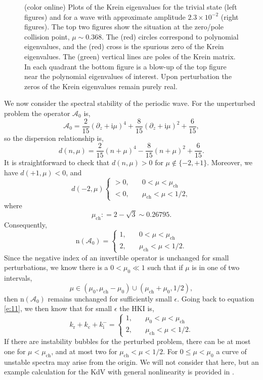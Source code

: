 \documentclass[review,onefignum,onetabnum]{siamart171218}
\def\coloneqq{\mathrel{\mathop:}=}
\newcommand{\rmc}{\mathrm{c}}
\newcommand{\rmi}{\mathrm{i}}
\newcommand{\rmn}{\mathrm{n}}
\newcommand{\rmr}{\mathrm{r}}
\newcommand{\calA}{\mathcal{A}}
\begin{document}
\begin{figure}[ht]
\begin{center}
\begin{tabular}{cc}
\end{tabular}
\caption{(color online) Plots of the Krein eigenvalues for the trivial state (left figures) and for
a wave with approximate amplitude $2.3\times10^{-2}$ (right figures). The top two figures show the
situation at the zero/pole collision
point, $\mu\sim0.368$. The (red) circles correspond to polynomial eigenvalues, and the (red) cross
is the spurious zero of the Krein eigenvalues. The (green) vertical lines are poles
of the Krein matrix. In each quadrant the bottom figure is a blow-up
of the top figure near the polynomial eigenvalues of interest. Upon perturbation the zeros of the Krein eigenvalues remain purely real.}
\label{f:KreinEvalCollide1}
\end{center}
\end{figure}

We now consider the spectral stability of the periodic wave.
For the unperturbed problem the operator $\calA_0$ is,
\[
\calA_0=\frac2{15}(\partial_z+\rmi\mu)^4+\frac8{15}(\partial_z+\rmi\mu)^2+\frac6{15},
\]
so the dispersion relationship is,
\[
d(n,\mu)=\frac2{15}(n+\mu)^4-\frac8{15}(n+\mu)^2+\frac6{15}.
\]
It is straightforward to check that $d(n,\mu)>0$ for $\mu\notin\{-2,+1\}$.
Moreover, we have $d(+1,\mu)<0$, and
\[
d(-2,\mu)\begin{cases}>0,\quad&0<\mu<\mu_{\mathrm{ch}}\\
<0,\quad&\mu_{\mathrm{ch}}<\mu<1/2,\end{cases}
\]
where
\[
\mu_{\mathrm{ch}}\coloneqq2-\sqrt{3}\sim0.26795.
\]
Consequently,
\[
\rmn(\calA_0)=\begin{cases}1,\quad&0<\mu<\mu_{\mathrm{ch}}\\
2,\quad&\mu_{\mathrm{ch}}<\mu<1/2.\end{cases}
\]
Since the negative index of an invertible operator is unchanged for small perturbations, we know there is a $0<\mu_0\ll1$ such that if $\mu$ is in one of two intervals,
\[
\mu\in\left(\mu_0,\mu_{\mathrm{ch}}-\mu_0\right)\cup
\left(\mu_{\mathrm{ch}}+\mu_0,1/2\right),
\]
then $\rmn(\calA_0)$ remains unchanged for sufficiently small $\epsilon$. Going back to equation \cref{e:11}, we then know that for small $\epsilon$ the HKI is,
\[
k_\rmr+k_\rmc+k_\rmi^-=\begin{cases}1,\quad&\mu_0<\mu<\mu_{\mathrm{ch}}\\
2,\quad&\mu_{\mathrm{ch}}<\mu<1/2.\end{cases}
\]
If there are instability bubbles for the perturbed problem, there can be at most one for $\mu<\mu_{\mathrm{ch}}$, and at most two for $\mu_{\mathrm{ch}}<\mu<1/2$. For $0\le\mu<\mu_0$ a curve of unstable spectra may arise from the origin. We will not consider that here, but an example calculation for the KdV with general nonlinearity is provided in \cite[Section~4]{haragus:ots08}.
\end{document}
